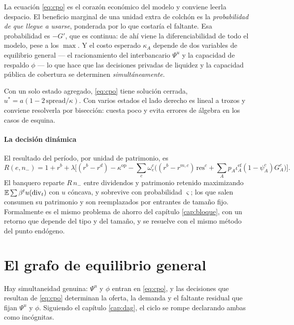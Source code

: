 \begin{idea}
La ecuación \eqref{eq:cpo} es el corazón económico del modelo y conviene leerla
despacio. El beneficio marginal de una unidad extra de colchón es la
\emph{probabilidad de que llegue a usarse}, ponderada por lo que costaría el
faltante. Esa probabilidad es $-G'$, que es continua: de ahí viene la
diferenciabilidad de todo el modelo, pese a los $\max$. Y el costo esperado
$\kappa_A$ depende de dos variables de equilibrio general --- el racionamiento
del interbancario $\Psi^u$ y la capacidad de respaldo $\phi$ --- lo que hace que
las decisiones privadas de liquidez y la capacidad pública de cobertura se
determinen \emph{simultáneamente}.
\end{idea}

Con un solo estado agregado, \eqref{eq:cpo} tiene solución cerrada,
$u^* = a(1-2\,\mathrm{spread}/\kappa)$. Con varios estados el lado derecho es
lineal a trozos y conviene resolverla por bisección: cuesta poco y evita errores
de álgebra en los casos de esquina.

\paragraph{La decisión dinámica} El resultado del período, por unidad de
patrimonio, es
\begin{equation}
R(e,n_-) = 1 + r^b + \lambda\Big[(r^b-r^d) - \kappa^{\text{op}}
- \sum_c \omega^c_e\big((r^b-r^{m,c})\,\mathrm{res}^c + \textstyle\sum_A p_A \iota^{\text{ef}}_A (1-\psi^c_A) G^c_A\big)\Big].
\end{equation}
El banquero reparte $R\,n_-$ entre dividendos y patrimonio retenido maximizando
$\mathbb{E}\sum\beta^t u(\mathrm{div}_t)$ con $u$ cóncava, y sobrevive con probabilidad
$\varsigma$; los que salen consumen su patrimonio y son reemplazados por
entrantes de tamaño fijo. Formalmente es el mismo problema de ahorro del
capítulo \ref{cap:bloque}, con un retorno que depende del tipo y del tamaño, y
se resuelve con el mismo método del punto endógeno.

\section{El grafo de equilibrio general}

Hay simultaneidad genuina: $\Psi^u$ y $\phi$ entran en \eqref{eq:cpo}, y las
decisiones que resultan de \eqref{eq:cpo} determinan la oferta, la demanda y el
faltante residual que fijan $\Psi^u$ y $\phi$. Siguiendo el capítulo
\ref{cap:dag}, el ciclo se rompe declarando ambas como incógnitas.

